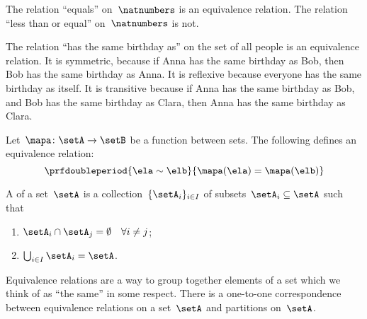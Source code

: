 \begin{example}
    The relation ``equals'' on~$\natnumbers$ is an equivalence relation.
    The relation ``less than or equal'' on~$\natnumbers$ is not.
\end{example}

\begin{example}
    The relation ``has the same birthday as'' on the set of all people is an equivalence relation.
    It is symmetric, because if Anna has the same birthday as Bob, then Bob has the same birthday as Anna.
    It is reflexive because everyone has the same birthday as itself.
    It is transitive because if Anna has the same birthday as Bob, and Bob has the same birthday as Clara, then Anna has the same birthday as Clara.
\end{example}

\begin{example}
    Let~$\mapa\colon \setA\to \setB$ be a function between sets.
    The following defines an equivalence relation:
    \begin{equation*}
        \prfdoubleperiod{
            \ela\sim \elb
        }{
            \mapa(\ela)=\mapa(\elb)
        }
    \end{equation*}
\end{example}

\begin{ctdefinition}[Partition]
    \label{def:partition}
    A \emph{} of a set~$\setA$ is a collection~$\{\setA_i\}_{i\in I}$ of subsets~$\setA_i\subseteq \setA$ such that
    \begin{enumerate}
        \item $\setA_i\cap \setA_j=\emptyset \quad \forall i\neq j$;
        \item $\bigcup_{i\in I}\setA_i=\setA$.
    \end{enumerate}
\end{ctdefinition}

\begin{remark}
    Equivalence relations are a way to group together elements of a set which we think of as ``the same'' in some respect.
    There is a one-to-one correspondence between equivalence relations on a set~$\setA$ and partitions on~$\setA$.
\end{remark}

\begin{marginfigure}
    \centering
    \caption{
        \label{fig:info_network}
    }
\end{marginfigure}

